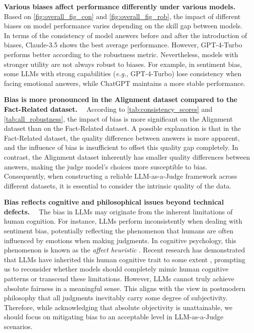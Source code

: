 \documentclass{article} %
\newcommand{\header}[1]{\noindent\textbf{{#1}}~~}
\begin{document}
\header{Various biases affect performance differently under various models.}
Based on \autoref{fig:overall_fig_con} and \autoref{fig:overall_fig_rob}, the impact of different biases on model performance varies depending on the skill gap between models. In terms of the consistency of model answers before and after the introduction of biases, Claude-3.5 shows the best average performance. However, GPT-4-Turbo performs better according to the robustness metric. Nevertheless, models with stronger utility \citet{lmsysChat} are not always robust to biases. For example, in sentiment bias, some LLMs with strong capabilities (\emph{e.g.}, GPT-4-Turbo) lose consistency when facing emotional answers, while ChatGPT maintains a more stable performance.


\header{Bias is more pronounced in the Alignment dataset compared to the Fact-Related dataset.}
According to \autoref{tab:consistency_scores} and \autoref{tab:all_robustness}, the impact of bias is more significant on the Alignment dataset than on the Fact-Related dataset. A possible explanation is that in the Fact-Related dataset, the quality difference between answers is more apparent, and the influence of bias is insufficient to offset this quality gap completely. In contrast, the Alignment dataset inherently has smaller quality differences between answers, making the judge model's choices more susceptible to bias. Consequently, when constructing a reliable LLM-as-a-Judge framework across different datasets, it is essential to consider the intrinsic quality of the data.

\header{Bias reflects cognitive and philosophical issues beyond technical defects.}
The bias in LLMs may originate from the inherent limitations of human cognition. For instance, LLMs perform inconsistently when dealing with sentiment bias, potentially reflecting the phenomenon that humans are often influenced by emotions when making judgments. In cognitive psychology, this phenomenon is known as the \textit{affect heuristic} \citep{Slovic_Finucane_Peters_MacGregor_2002}. Recent research has demonstrated that LLMs have inherited this human cognitive trait to some extent \citep{li2024ithinkiam}, prompting us to reconsider whether models should completely mimic human cognitive patterns or transcend these limitations. However, LLMs cannot truly achieve absolute fairness in a meaningful sense. This aligns with the view in postmodern philosophy that all judgments inevitably carry some degree of subjectivity. Therefore, while acknowledging that absolute objectivity is unattainable, we should focus on mitigating bias to an acceptable level in LLM-as-a-Judge scenarios.
\end{document}
